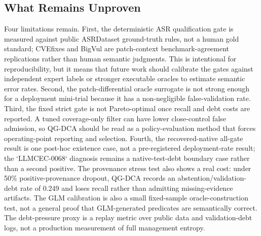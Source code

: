 ﻿\documentclass[lettersize,journal]{IEEEtran}
\begin{document}
\subsection{What Remains Unproven}
Four limitations remain. First, the deterministic ASR qualification gate is measured against public ASRDataset ground-truth rules, not a human gold standard; CVEfixes and BigVul are patch-context benchmark-agreement replications rather than human semantic judgments. This is intentional for reproducibility, but it means that future work should calibrate the gates against independent expert labels or stronger executable oracles to estimate semantic error rates. Second, the patch-differential oracle surrogate is not strong enough for a deployment mini-trial because it has a non-negligible false-validation rate. Third, the fixed strict gate is not Pareto-optimal once recall and debt costs are reported. A tuned coverage-only filter can have lower close-control false admission, so QG-DCA should be read as a policy-evaluation method that forces operating-point reporting and selection. Fourth, the recovered-native all-gate result is one post-hoc existence case, not a pre-registered deployment-rate result; the `LLMCEC-0068` diagnosis remains a native-test-debt boundary case rather than a second positive. The provenance stress test also shows a real cost: under 50\% positive-provenance dropout, QG-DCA records an abstention/validation-debt rate of 0.249 and loses recall rather than admitting missing-evidence artifacts. The GLM calibration is also a small fixed-sample oracle-construction test, not a general proof that GLM-generated predicates are semantically correct. The debt-pressure proxy is a replay metric over public data and validation-debt logs, not a production measurement of full management entropy.
\end{document}
